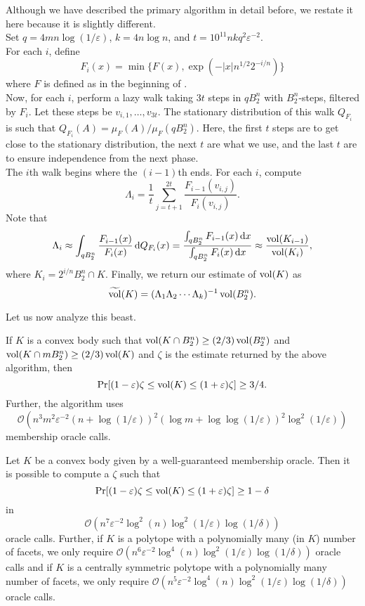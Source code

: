 Although we have described the primary algorithm in detail before, we restate it here because it is slightly different.\\
Set $q=4mn\log(1/\varepsilon)$, $k=4n\log n$, and $t=10^{11}nkq^2\varepsilon^{-2}$.\\
For each $i$, define
\[ F_i(x) = \min\{F(x), \exp(-|x|n^{1/2}2^{-i/n})\} \]
where $F$ is defined as in the beginning of .\\
Now, for each $i$, perform a lazy walk taking $3t$ steps in $qB_2^n$ with $B_2^n$-steps, filtered by $F_i$. Let these steps be $v_{i,1},\ldots,v_{3t}$. The stationary distribution of this walk $Q_{F_i}$ is such that $Q_{F_i}(A) = \mu_F(A)/\mu_F(qB_2^n)$. Here, the first $t$ steps are to get close to the stationary distribution, the next $t$ are what we use, and the last $t$ are to ensure independence from the next phase. \\
The $i$th walk begins where the $(i-1)$th ends. For each $i$, compute
\[ \Lambda_i = \frac{1}{t} \sum_{j=t+1}^{2t} \frac{F_{i-1}(v_{i,j})}{F_i(v_{i,j})}. \]
Note that
\[ \Lambda_i \approx \int_{qB_2^n} \frac{F_{i-1}(x)}{F_i(x)} \operatorname{d}\!{Q}_{F_i}(x) = \frac{\int_{qB_2^n} F_{i-1}(x) \operatorname{d}\!{x}}{\int_{qB_2^n} F_i(x) \operatorname{d}\!{x}} \approx \frac{\operatorname{vol}(K_{i-1})}{\operatorname{vol}(K_i)}, \]
where $K_i = 2^{i/n} B_2^n \cap K$. Finally, we return our estimate of $\operatorname{vol}(K)$ as
\[ \widetilde{\operatorname{vol}}(K) = (\Lambda_1\Lambda_2\cdots\Lambda_k)^{-1} \operatorname{vol}(B_2^n). \]

Let us now analyze this beast.

\begin{ftheo}
	If $K$ is a convex body such that $\operatorname{vol}(K\cap B_2^n) \geq (2/3) \operatorname{vol}(B_2^n)$ and $\operatorname{vol}(K\cap mB_2^n) \geq (2/3) \operatorname{vol}(K)$ and $\zeta$ is the estimate returned by the above algorithm, then
	\[ \Pr[(1-\varepsilon)\zeta \leq \operatorname{vol}(K) \leq (1+\varepsilon)\zeta] \geq 3/4. \]
	Further, the algorithm uses
	\[ \mathcal{O}\left(n^3m^2\varepsilon^{-2} (n+\log(1/\varepsilon))^2 (\log m + \log\log(1/\varepsilon))^2 \log^2(1/\varepsilon) \right) \]
	membership oracle calls.
\end{ftheo}

\begin{corollary}
	Let $K$ be a convex body given by a well-guaranteed membership oracle. Then it is possible to compute a $\zeta$ such that
	\[ \Pr[(1-\varepsilon)\zeta \leq \operatorname{vol}(K) \leq (1+\varepsilon)\zeta] \geq 1-\delta \]
	in
	\[ \mathcal{O}\left(n^7 \varepsilon^{-2} \log^2 (n) \log^2(1/\varepsilon) \log(1/\delta) \right) \]
	oracle calls. Further, if $K$ is a polytope with a polynomially many (in $K$) number of facets, we only require $\mathcal{O}\left(n^6 \varepsilon^{-2} \log^4 (n) \log^2(1/\varepsilon) \log(1/\delta) \right)$	oracle calls and if $K$ is a centrally symmetric polytope with a polynomially many number of facets, we only require $\mathcal{O}\left(n^5 \varepsilon^{-2} \log^4 (n) \log^2(1/\varepsilon) \log(1/\delta) \right)$ oracle calls.
\end{corollary}

